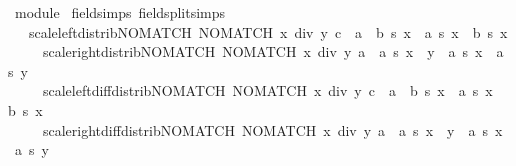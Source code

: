 \begin{isabellebody}
\endisatagML
{\isafoldML}%
%
\isadelimML
\isanewline
%
\endisadelimML
\isanewline
{}\isamarkupfalse%
\ module\isanewline
{}\isanewline
\isanewline
{}\isamarkupfalse%
\ {\isacharbrackleft}{\kern0pt}field{\isacharunderscore}{\kern0pt}simps{\isacharcomma}{\kern0pt}\ field{\isacharunderscore}{\kern0pt}split{\isacharunderscore}{\kern0pt}simps{\isacharbrackright}{\kern0pt}{\isacharcolon}{\kern0pt}\isanewline
\ \ \ scale{\isacharunderscore}{\kern0pt}left{\isacharunderscore}{\kern0pt}distrib{\isacharunderscore}{\kern0pt}NO{\isacharunderscore}{\kern0pt}MATCH{\isacharcolon}{\kern0pt}\ {\isachardoublequoteopen}NO{\isacharunderscore}{\kern0pt}MATCH\ {\isacharparenleft}{\kern0pt}x\ div\ y{\isacharparenright}{\kern0pt}\ c\ {\isasymLongrightarrow}\ {\isacharparenleft}{\kern0pt}a\ {\isacharplus}{\kern0pt}\ b{\isacharparenright}{\kern0pt}\ {\isacharasterisk}{\kern0pt}s\ x\ {\isacharequal}{\kern0pt}\ a\ {\isacharasterisk}{\kern0pt}s\ x\ {\isacharplus}{\kern0pt}\ b\ {\isacharasterisk}{\kern0pt}s\ x{\isachardoublequoteclose}\isanewline
\ \ \ \ \ scale{\isacharunderscore}{\kern0pt}right{\isacharunderscore}{\kern0pt}distrib{\isacharunderscore}{\kern0pt}NO{\isacharunderscore}{\kern0pt}MATCH{\isacharcolon}{\kern0pt}\ {\isachardoublequoteopen}NO{\isacharunderscore}{\kern0pt}MATCH\ {\isacharparenleft}{\kern0pt}x\ div\ y{\isacharparenright}{\kern0pt}\ a\ {\isasymLongrightarrow}\ a\ {\isacharasterisk}{\kern0pt}s\ {\isacharparenleft}{\kern0pt}x\ {\isacharplus}{\kern0pt}\ y{\isacharparenright}{\kern0pt}\ {\isacharequal}{\kern0pt}\ a\ {\isacharasterisk}{\kern0pt}s\ x\ {\isacharplus}{\kern0pt}\ a\ {\isacharasterisk}{\kern0pt}s\ y{\isachardoublequoteclose}\isanewline
\ \ \ \ \ scale{\isacharunderscore}{\kern0pt}left{\isacharunderscore}{\kern0pt}diff{\isacharunderscore}{\kern0pt}distrib{\isacharunderscore}{\kern0pt}NO{\isacharunderscore}{\kern0pt}MATCH{\isacharcolon}{\kern0pt}\ {\isachardoublequoteopen}NO{\isacharunderscore}{\kern0pt}MATCH\ {\isacharparenleft}{\kern0pt}x\ div\ y{\isacharparenright}{\kern0pt}\ c\ {\isasymLongrightarrow}\ {\isacharparenleft}{\kern0pt}a\ {\isacharminus}{\kern0pt}\ b{\isacharparenright}{\kern0pt}\ {\isacharasterisk}{\kern0pt}s\ x\ {\isacharequal}{\kern0pt}\ a\ {\isacharasterisk}{\kern0pt}s\ x\ {\isacharminus}{\kern0pt}\ b\ {\isacharasterisk}{\kern0pt}s\ x{\isachardoublequoteclose}\isanewline
\ \ \ \ \ scale{\isacharunderscore}{\kern0pt}right{\isacharunderscore}{\kern0pt}diff{\isacharunderscore}{\kern0pt}distrib{\isacharunderscore}{\kern0pt}NO{\isacharunderscore}{\kern0pt}MATCH{\isacharcolon}{\kern0pt}\ {\isachardoublequoteopen}NO{\isacharunderscore}{\kern0pt}MATCH\ {\isacharparenleft}{\kern0pt}x\ div\ y{\isacharparenright}{\kern0pt}\ a\ {\isasymLongrightarrow}\ a\ {\isacharasterisk}{\kern0pt}s\ {\isacharparenleft}{\kern0pt}x\ {\isacharminus}{\kern0pt}\ y{\isacharparenright}{\kern0pt}\ {\isacharequal}{\kern0pt}\ a\ {\isacharasterisk}{\kern0pt}s\ x\ {\isacharminus}{\kern0pt}\ a\ {\isacharasterisk}{\kern0pt}s\ y{\isachardoublequoteclose}\isanewline

\end{isabellebody}
